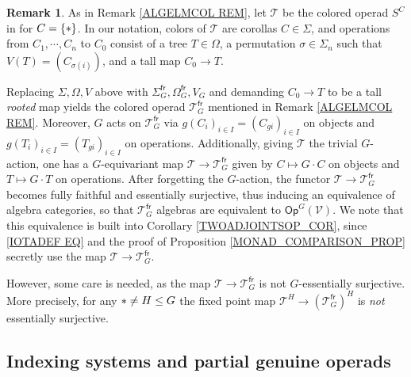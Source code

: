 \documentclass[a4paper,10pt
,draft
]{article}%
\numberwithin{equation}{section}
\numberwithin{figure}{section}
\theoremstyle{definition} %
\newtheorem{remark}[equation]{Remark}%
\newcommand{\F}{\ensuremath{\mathcal F}}
\newcommand{\1}{\ensuremath{\mathbbm 1}}%
\begin{document}
\begin{remark}\label{SOMEMOREDET REM}
	As in Remark \ref{ALGELMCOL REM},
	let $\mathcal{T}$ 
	be the colored operad $S^C$ in \cite[\S 3.2]{GV12} for $C=\{\**\}$.
	In our notation, 
	colors of $\mathcal{T}$ are corollas $C \in \Sigma$,
	and operations from $C_1,\cdots,C_n$ to $C_0$
	consist of a tree $T\in \Omega$, a permutation 
	$\sigma \in \Sigma_n$
	such that $V(T) = (C_{\sigma(i)})$,
	and a tall map $C_0 \to T$.
	
	Replacing $\Sigma,\Omega,V$ above with 
	$\Sigma_G^{\mathsf{fr}},\Omega_G^{\mathsf{fr}},V_G$
	and demanding $C_0 \to T$ to be a tall \emph{rooted} map
	yields the colored operad $\mathcal{T}^{\mathsf{fr}}_G$
	mentioned in Remark \ref{ALGELMCOL REM}.
	Moreover, $G$ acts on $\mathcal{T}^{\mathsf{fr}}_G$ 
	via 
	$g(C_i)_{i\in I} = (C_{gi})_{i\in I}$
	on objects and 
	$g(T_i)_{i\in I} = (T_{gi})_{i\in I}$ on operations.
	Additionally,
	giving $\mathcal{T}$ the trivial $G$-action,
	one has a $G$-equivariant map
	$\mathcal{T} \to \mathcal{T}^{\mathsf{fr}}_G$
	given by 
	$C \mapsto G \cdot C$ on objects
	and
	$T \mapsto G \cdot T$ on operations.
	After forgetting the $G$-action,
	the functor $\mathcal{T} \to \mathcal{T}^{\mathsf{fr}}_G$
	becomes fully faithful and essentially surjective,
	thus inducing an equivalence of algebra categories,
	so that $\mathcal{T}^{\mathsf{fr}}_G$ algebras are equivalent to 
	$\mathsf{Op}^G(\mathcal{V})$.
	We note that this equivalence is built into 
	Corollary \ref{TWOADJOINTSOP_COR},
	since \eqref{IOTADEF EQ} and the proof of 
	Proposition \ref{MONAD_COMPARISON_PROP}
	secretly use the map $\mathcal{T} \to \mathcal{T}^{\mathsf{fr}}_G$.
	
	However, some care is needed, as the map 
	$\mathcal{T} \to \mathcal{T}^{\mathsf{fr}}_G$
	is not $G$-essentially surjective.
	More precisely, for any $\** \neq H \leq G$
	the fixed point map
	$\mathcal{T}^H \to \left(\mathcal{T}^{\mathsf{fr}}_G\right)^H$
	is \emph{not} essentially surjective.
\end{remark}





\renewcommand{\F}{\mathcal{F}}

\subsection{Indexing systems and partial genuine operads}
\label{INDEXING_SECTION}
\end{document}
